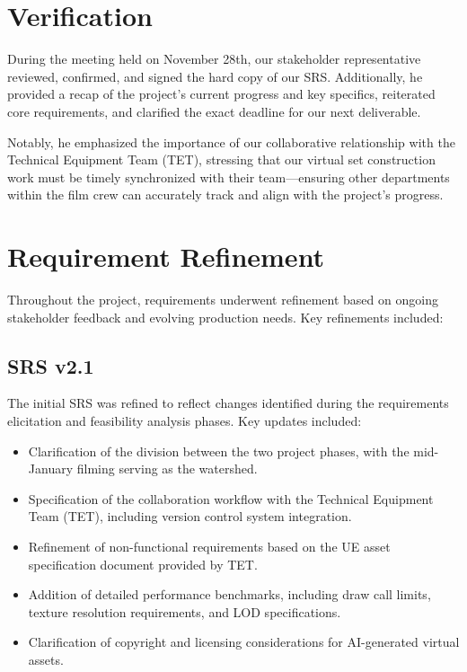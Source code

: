 \documentclass[12pt,a4paper]{report}
\begin{document}
\section{Verification}

During the meeting held on November 28th, our stakeholder representative reviewed, confirmed, and signed the hard copy of our SRS. Additionally, he provided a recap of the project's current progress and key specifics, reiterated core requirements, and clarified the exact deadline for our next deliverable.

Notably, he emphasized the importance of our collaborative relationship with the Technical Equipment Team (TET), stressing that our virtual set construction work must be timely synchronized with their team—ensuring other departments within the film crew can accurately track and align with the project's progress.

\section{Requirement Refinement}

Throughout the project, requirements underwent refinement based on ongoing stakeholder feedback and evolving production needs. Key refinements included:

\subsection{SRS v2.1}

The initial SRS was refined to reflect changes identified during the requirements elicitation and feasibility analysis phases. Key updates included:

\begin{itemize}
    \item Clarification of the division between the two project phases, with the mid-January filming serving as the watershed.
    \item Specification of the collaboration workflow with the Technical Equipment Team (TET), including version control system integration.
    \item Refinement of non-functional requirements based on the UE asset specification document provided by TET.
    \item Addition of detailed performance benchmarks, including draw call limits, texture resolution requirements, and LOD specifications.
    \item Clarification of copyright and licensing considerations for AI-generated virtual assets.
\end{itemize}
\end{document}
